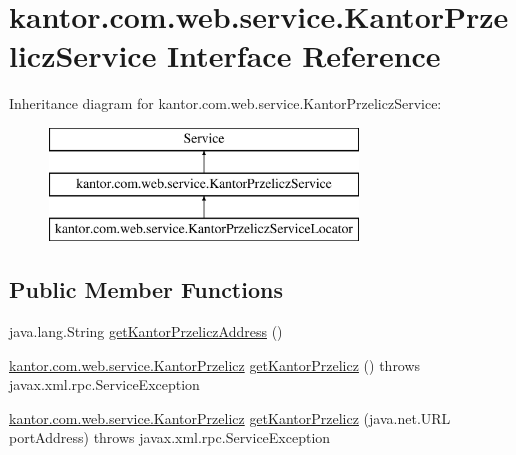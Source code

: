 \hypertarget{interfacekantor_1_1com_1_1web_1_1service_1_1_kantor_przelicz_service}{\section{kantor.\+com.\+web.\+service.\+Kantor\+Przelicz\+Service Interface Reference}
\label{interfacekantor_1_1com_1_1web_1_1service_1_1_kantor_przelicz_service}
}
Inheritance diagram for kantor.\+com.\+web.\+service.\+Kantor\+Przelicz\+Service\+:\begin{figure}[H]
\begin{center}
\leavevmode
\includegraphics[height=3.000000cm]{interfacekantor_1_1com_1_1web_1_1service_1_1_kantor_przelicz_service}
\end{center}
\end{figure}
\subsection*{Public Member Functions}
\begin{DoxyCompactItemize}
\item 
java.\+lang.\+String \hyperlink{interfacekantor_1_1com_1_1web_1_1service_1_1_kantor_przelicz_service_a6e8a852eedd0efb826c9b7fba061e577}{get\+Kantor\+Przelicz\+Address} ()
\item 
\hyperlink{classkantor_1_1com_1_1web_1_1service_1_1_kantor_przelicz}{kantor.\+com.\+web.\+service.\+Kantor\+Przelicz} \hyperlink{interfacekantor_1_1com_1_1web_1_1service_1_1_kantor_przelicz_service_a23dc3e9c5f8aaeb4d50a1e8b6f51677b}{get\+Kantor\+Przelicz} ()  throws javax.\+xml.\+rpc.\+Service\+Exception
\item 
\hyperlink{classkantor_1_1com_1_1web_1_1service_1_1_kantor_przelicz}{kantor.\+com.\+web.\+service.\+Kantor\+Przelicz} \hyperlink{interfacekantor_1_1com_1_1web_1_1service_1_1_kantor_przelicz_service_a3c33e0adf664558840bd2e1b1d9da37d}{get\+Kantor\+Przelicz} (java.\+net.\+U\+R\+L port\+Address)  throws javax.\+xml.\+rpc.\+Service\+Exception
\end{DoxyCompactItemize}


